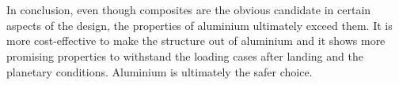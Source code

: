 \\
\\
In conclusion, even though composites are the obvious candidate in certain aspects of the design, the properties of aluminium ultimately exceed them. It is more cost-effective to make the structure out of aluminium and it shows more promising properties to withstand the loading cases after landing and the planetary conditions. Aluminium is ultimately the safer choice.
